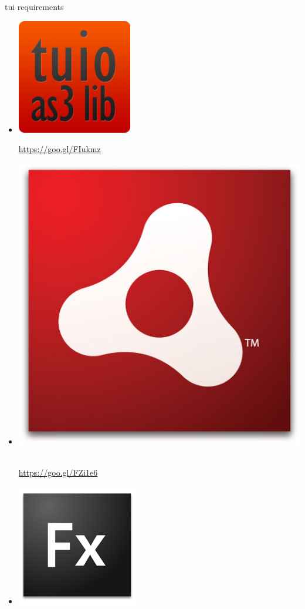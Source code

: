 \begin{frame}%
\begin{block}{tui requirements}
\begin{minipage}{1.0\linewidth}
\begin{itemize}
\item[] \includegraphics[scale=0.16]{images/tuioAS3.png}$\;$
\begin{scriptsize}
\url{https://goo.gl/FIukmz}
\end{scriptsize}%
\item[] \includegraphics[scale=0.06]{images/Adobe-Air.jpg}$\;$
\begin{scriptsize}
\url{https://goo.gl/FZi1e6}
\end{scriptsize}
\item[] \includegraphics[scale=0.16]{images/Fx_small.png}$\;$

\end{itemize}
\end{minipage}
\end{block}
\end{frame}
